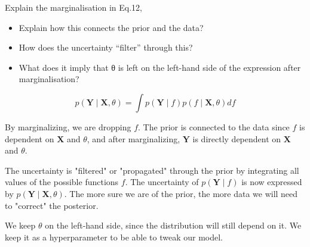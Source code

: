 \documentclass[12pt]{article}
\newenvironment{question}[2][Question]{\begin{trivlist}
\kern10pt
\item[\hskip \labelsep {\bfseries #1}\hskip \labelsep {\bfseries #2.}]}{\end{trivlist}}
\newcommand*{\answer}{%
  \par
  \kern1pt
  \begingroup
    \centering
    \raisebox{.2\baselineskip}{%
      \textcolor{gray}{
	    \rule{.6667\linewidth}{.1pt}%
      }
    }%
    \par
  \kern8pt
  \endgroup
}
\begin{document}
\begin{question}{10}
Explain the marginalisation in Eq.12,
\begin{itemize}
\item Explain how this connects the prior and the data?
\item How does the uncertainty “filter” through this?
\item What does it imply that θ is left on the left-hand side of the expression after marginalisation?
\end{itemize}

\answer

$$p(\boldsymbol{Y} \mid \boldsymbol{X}, \theta) = \int p(\boldsymbol{Y} \mid f)p(f \mid \boldsymbol{X}, \theta)df$$

By marginalizing, we are dropping $f$. The prior is connected to the data since $f$ is dependent on $\boldsymbol{X}$ and $\theta$, and after marginalizing, $\boldsymbol{Y}$ is directly dependent on $\boldsymbol{X}$ and $\theta$.

The uncertainty is "filtered" or "propagated" through the prior by integrating all values of the possible functions $f$. The uncertainty of $p(\boldsymbol{Y} \mid f)$ is now expressed by $p(\boldsymbol{Y} \mid \boldsymbol{X}, \theta)$. The more sure we are of the prior, the more data we will need to "correct" the posterior.

We keep $\theta$ on the left-hand side, since the distribution will still depend on it. We keep it as a hyperparameter to be able to tweak our model.
\end{question}
\end{document}
